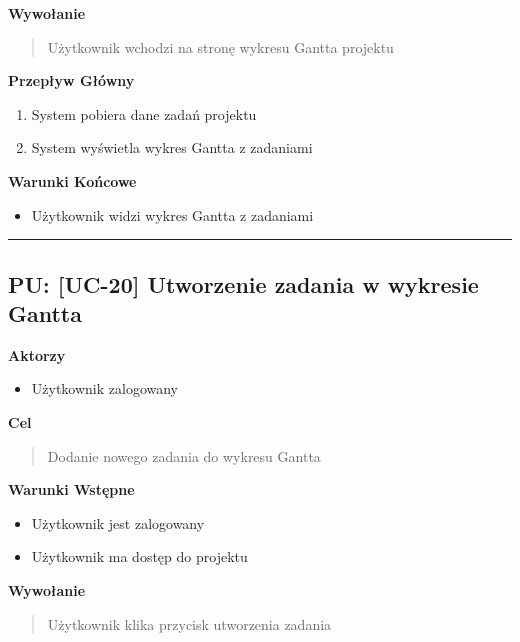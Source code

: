 \vspace{0.2cm}
\noindent\textbf{Wywołanie}
\begin{quote}
    Użytkownik wchodzi na stronę wykresu Gantta projektu
\end{quote}

\vspace{0.2cm}
\noindent\textbf{Przepływ Główny}
\begin{enumerate}
    \item System pobiera dane zadań projektu
    \item System wyświetla wykres Gantta z zadaniami
\end{enumerate}

\vspace{0.2cm}
\noindent\textbf{Warunki Końcowe}
\begin{itemize}
    \item Użytkownik widzi wykres Gantta z zadaniami
\end{itemize}


\hrule
\vspace{1cm}

\subsection*{PU: [UC-20] Utworzenie zadania w wykresie Gantta}

\noindent\textbf{Aktorzy}
\begin{itemize}
    \item Użytkownik zalogowany
\end{itemize}

\vspace{0.2cm}
\noindent\textbf{Cel}
\begin{quote}
    Dodanie nowego zadania do wykresu Gantta
\end{quote}

\vspace{0.2cm}
\noindent\textbf{Warunki Wstępne}
\begin{itemize}
    \item Użytkownik jest zalogowany
    \item Użytkownik ma dostęp do projektu
\end{itemize}

\vspace{0.2cm}
\noindent\textbf{Wywołanie}
\begin{quote}
    Użytkownik klika przycisk utworzenia zadania
\end{quote}

